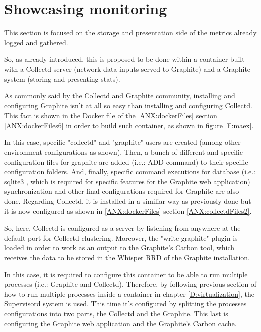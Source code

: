 \section{Showcasing monitoring}

This section is focused on the storage and presentation side of the metrics already logged and gathered.

So, as already introduced, this is proposed to be done within a container built with a Collectd server (network data inputs served to Graphite) and a Graphite system (storing and presenting stats).

As commonly said by the Collectd and Graphite community, installing and configuring Graphite isn't at all so easy than installing and configuring Collectd. This fact is shown in the Docker file of the \ref{ANX:dockerFiles} section \ref{ANX:dockerFiles6} in order to build such container, as shown in figure \ref{F:maex}.

In this case, specific "collectd" and "graphite" users are created (among other environment configurations as shown). Then, a bunch of different and specific configuration files for graphite are added (i.e.: ADD command) to their specific configuration folders. And, finally, specific command executions for database (i.e.: sqlite3 \cite{sqlite}, which is required for specific features for the Graphite web application) synchronization and other final configurations required for Graphite are also done. Regarding Collectd, it is installed in a similiar way as previously done but it is now configured as shown in \ref{ANX:dockerFiles} section \ref{ANX:collectdFiles2}.

So, here, Collectd is configured as a server by listening from anywhere at the default port for Collectd clustering. Moreover, the "write graphite" plugin is loaded in order to work as an output to the Graphite's Carbon tool, which receives the data to be stored in the Whisper RRD of the Graphite installation.

In this case, it is required to configure this container to be able to run multiple processes (i.e.: Graphite and Collectd). Therefore, by following previous section of how to run multiple processes inside a container in chapter \ref{D:virtualization}, the Supervisord system is used. This time it's configured by splitting the processes configurations into two parts, the Collectd and the Graphite. This last is configuring the Graphite web application and the Graphite's Carbon cache.

